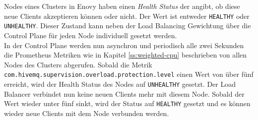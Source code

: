 Nodes eines Clusters in Enovy haben einen \textit{Health Status} der angibt, ob diese neue Clients akzeptieren können oder nicht. Der Wert ist entweder \verb|HEALTHY| oder \verb|UNHEALTHY|. Dieser Zustand kann neben der Load Balancing Gewichtung über die Control Plane für jeden Node individuell gesetzt werden.
\\
In der Control Plane werden nun asynchron und periodisch alle zwei Sekunden die Prometheus Metriken wie in Kapitel \ref{ss:weighted-cpu} beschrieben von allen Nodes des Clusters abgerufen. Sobald die Metrik \verb|com.hivemq.supervision.overload.protection.level| einen Wert von über fünf erreicht, wird der Health Status des Nodes auf \verb|UNHEALTHY| gesetzt. Der Load Balancer verbindet nun keine neuen Clients mehr mit diesem Node. Sobald der Wert wieder unter fünf sinkt, wird der Status auf \verb|HEALTHY| gesetzt und es können wieder neue Clients mit dem Node verbunden werden.

